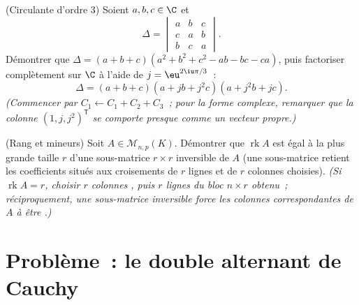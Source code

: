 \begin{exercise}[$\star\star$]\label{exo:b1:det:11}
(Circulante d'ordre $3$) Soient $a, b, c \in \C$ et
\[
\Delta = \begin{vmatrix}
a & b & c\\
c & a & b\\
b & c & a
\end{vmatrix}.
\]
Démontrer que $\Delta = (a + b + c)(a^2 + b^2 + c^2 - ab - bc -
ca)$, puis factoriser complètement sur $\C$ à l'aide de $j =
\eu^{2\iu\pi/3}$~:
\[
\Delta = (a + b + c)(a + jb + j^2c)(a + j^2b + jc) .
\]
\emph{(Commencer par $C_1 \leftarrow C_1 + C_2 + C_3$~; pour la forme
complexe, remarquer que la colonne $(1, j, j^2)^{\mathsf T}$ se
comporte presque comme un vecteur propre.)}
\end{exercise}

\begin{exercise}[$\star\star\star$]\label{exo:b1:det:12}
(Rang et mineurs) Soit $A \in \mathcal{M}_{n,p}(K)$. Démontrer que
$\operatorname{rk} A$ est égal à la plus grande taille $r$ d'une
sous-matrice $r \times r$ inversible de $A$ (une sous-matrice retient
les coefficients situés aux croisements de $r$ lignes et de $r$
colonnes choisies). \emph{(Si $\operatorname{rk} A = r$, choisir $r$
colonnes , puis $r$ lignes  du bloc $n \times r$ obtenu~;
réciproquement, une sous-matrice inversible force les colonnes
correspondantes de $A$ à être .)}
\end{exercise}

\section{Problème~: le double alternant de Cauchy}

